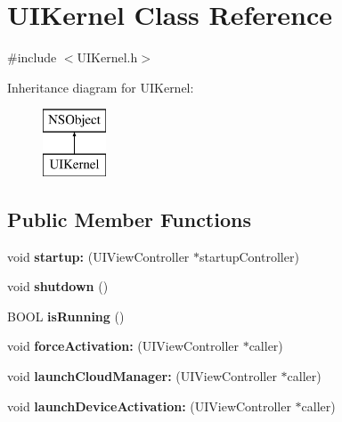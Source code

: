 \hypertarget{interface_u_i_kernel}{
\section{\-U\-I\-Kernel \-Class \-Reference}
\label{interface_u_i_kernel}
}


{\ttfamily \#include $<$\-U\-I\-Kernel.\-h$>$}

\-Inheritance diagram for \-U\-I\-Kernel\-:\begin{figure}[H]
\begin{center}
\leavevmode
\includegraphics[height=2.000000cm]{interface_u_i_kernel}
\end{center}
\end{figure}
\subsection*{\-Public \-Member \-Functions}
\begin{DoxyCompactItemize}
\item 
\hypertarget{interface_u_i_kernel_ae4a660f362f5d473cb1dbf96e38bf2b8}{
void {\bfseries startup\-:} (\-U\-I\-View\-Controller $\ast$startup\-Controller)}
\label{interface_u_i_kernel_ae4a660f362f5d473cb1dbf96e38bf2b8}

\item 
\hypertarget{interface_u_i_kernel_aa87848b5862041cfe4af17fa9ea80194}{
void {\bfseries shutdown} ()}
\label{interface_u_i_kernel_aa87848b5862041cfe4af17fa9ea80194}

\item 
\hypertarget{interface_u_i_kernel_a12b1b335a7feb23e72621a289fcc7354}{
\-B\-O\-O\-L {\bfseries is\-Running} ()}
\label{interface_u_i_kernel_a12b1b335a7feb23e72621a289fcc7354}

\item 
\hypertarget{interface_u_i_kernel_ad06e5ea4e9b84a3301bf540d4f542b86}{
void {\bfseries force\-Activation\-:} (\-U\-I\-View\-Controller $\ast$caller)}
\label{interface_u_i_kernel_ad06e5ea4e9b84a3301bf540d4f542b86}

\item 
\hypertarget{interface_u_i_kernel_a1c79d52404091b0c5f93fc4c8a21db26}{
void {\bfseries launch\-Cloud\-Manager\-:} (\-U\-I\-View\-Controller $\ast$caller)}
\label{interface_u_i_kernel_a1c79d52404091b0c5f93fc4c8a21db26}

\item 
\hypertarget{interface_u_i_kernel_a4159ec731bf960ac27e919e841cbceb8}{
void {\bfseries launch\-Device\-Activation\-:} (\-U\-I\-View\-Controller $\ast$caller)}
\label{interface_u_i_kernel_a4159ec731bf960ac27e919e841cbceb8}

\end{DoxyCompactItemize}
